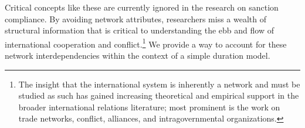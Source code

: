 Critical concepts like these are currently ignored in the research on sanction compliance. By avoiding network attributes, researchers miss a wealth of structural information that is critical to understanding the ebb and flow of international cooperation and conflict.\footnote{The insight that the international system is inherently a network and must be studied as such has gained increasing theoretical and empirical support in the broader international relations literature; most prominent is the work on trade networks,\cite{hoff2004modeling, ward:rainbow:2013} conflict,\cite{AnneAuthor} alliances,\cite{warren2010geometry} and intragovernmental organizations.\cite{cao2009networks,greenhill2010norm}} We provide a way to account for these network interdependencies within the context of a simple duration model.



